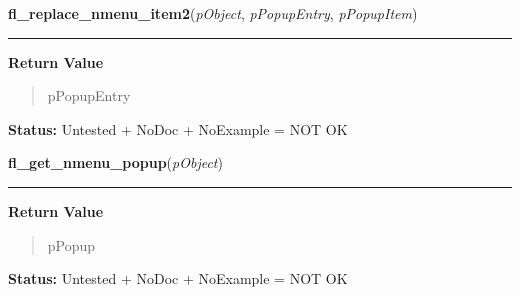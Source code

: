     \label{xformslib:library:fl_replace_nmenu_item2}

    \vspace{0.5ex}

\hspace{.8\funcindent}\begin{boxedminipage}{\funcwidth}

    \raggedright \textbf{fl\_replace\_nmenu\_item2}(\textit{pObject}, \textit{pPopupEntry}, \textit{pPopupItem})

    \vspace{-1.5ex}

    \rule{\textwidth}{0.5\fboxrule}
\setlength{\parskip}{2ex}
\setlength{\parskip}{1ex}
      \textbf{Return Value}
    \vspace{-1ex}

      \begin{quote}
      pPopupEntry

      \end{quote}

\textbf{Status:} Untested + NoDoc + NoExample = NOT OK



    \end{boxedminipage}

    \label{xformslib:library:fl_get_nmenu_popup}

    \vspace{0.5ex}

\hspace{.8\funcindent}\begin{boxedminipage}{\funcwidth}

    \raggedright \textbf{fl\_get\_nmenu\_popup}(\textit{pObject})

    \vspace{-1.5ex}

    \rule{\textwidth}{0.5\fboxrule}
\setlength{\parskip}{2ex}
\setlength{\parskip}{1ex}
      \textbf{Return Value}
    \vspace{-1ex}

      \begin{quote}
      pPopup

      \end{quote}

\textbf{Status:} Untested + NoDoc + NoExample = NOT OK



    \end{boxedminipage}

